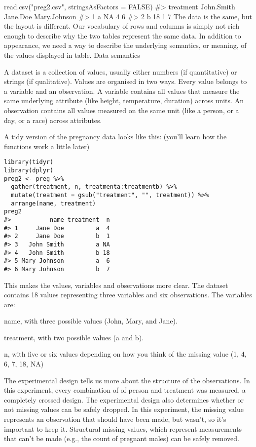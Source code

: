 read.csv("preg2.csv", stringsAsFactors = FALSE)
#>   treatment John.Smith Jane.Doe Mary.Johnson
#> 1         a         NA        4            6
#> 2         b         18        1            7
The data is the same, but the layout is different. Our vocabulary of rows and columns is simply not rich enough to describe why the two tables represent the same data. In addition to appearance, we need a way to describe the underlying semantics, or meaning, of the values displayed in table.
Data semantics

A dataset is a collection of values, usually either numbers (if quantitative) or strings (if qualitative). Values are organised in two ways. Every value belongs to a variable and an observation. A variable contains all values that measure the same underlying attribute (like height, temperature, duration) across units. An observation contains all values measured on the same unit (like a person, or a day, or a race) across attributes.

A tidy version of the pregnancy data looks like this: (you'll learn how the functions work a little later)

\begin{framed}
\begin{verbatim}
library(tidyr)
library(dplyr)
preg2 <- preg %>% 
  gather(treatment, n, treatmenta:treatmentb) %>%
  mutate(treatment = gsub("treatment", "", treatment)) %>%
  arrange(name, treatment)
preg2
#>           name treatment  n
#> 1     Jane Doe         a  4
#> 2     Jane Doe         b  1
#> 3   John Smith         a NA
#> 4   John Smith         b 18
#> 5 Mary Johnson         a  6
#> 6 Mary Johnson         b  7
\end{verbatim}
\end{framed}

This makes the values, variables and observations more clear. The dataset contains 18 values representing three variables and six observations. The variables are:

name, with three possible values (John, Mary, and Jane).

treatment, with two possible values (a and b).

n, with five or six values depending on how you think of the missing value (1, 4, 6, 7, 18, NA)

The experimental design tells us more about the structure of the observations. In this experiment, every combination of of person and treatment was measured, a completely crossed design. The experimental design also determines whether or not missing values can be safely dropped. In this experiment, the missing value represents an observation that should have been made, but wasn't, so it's important to keep it. Structural missing values, which represent measurements that can't be made (e.g., the count of pregnant males) can be safely removed.

